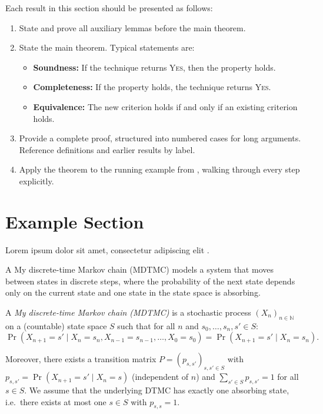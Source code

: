 Each result in this section should be presented as follows:
\begin{enumerate}
    \item State and prove all auxiliary lemmas before the main theorem.
    \item State the main theorem.  Typical statements are:
          \begin{itemize}
              \item \textbf{Soundness:} If the technique returns \textsc{Yes},
                    then the property holds.
              \item \textbf{Completeness:} If the property holds, the technique
                    returns \textsc{Yes}.
              \item \textbf{Equivalence:} The new criterion holds if and only if
                    an existing criterion holds.
          \end{itemize}
    \item Provide a complete proof, structured into numbered cases for long
          arguments.  Reference definitions and earlier results by label.
    \item Apply the theorem to the running example from ,
          walking through every step explicitly.
\end{enumerate}

\section{Example Section}

Lorem ipsum dolor sit amet, consectetur adipiscing elit \cite{Doe2024Example}. 


A My discrete-time Markov chain (MDTMC) models a system that moves between states in discrete steps, where the probability of the next state depends only on the current state and one state in the state space is absorbing.

\begin{definition}
A \emph{My discrete-time Markov chain (MDTMC)} is a stochastic process $(X_n)_{n\in\mathbb{N}}$ on a (countable) state space $S$ such that for all $n$ and $s_0,\dots,s_{n},s'\in S$:
$$
\Pr(X_{n+1}=s' \mid X_n=s_n, X_{n-1}=s_{n-1},\dots,X_0=s_0)
=\Pr(X_{n+1}=s' \mid X_n=s_n).
$$

Moreover, there exists a transition matrix $P=(p_{s,s'})_{s,s'\in S}$ with
$p_{s,s'}=\Pr(X_{n+1}=s'\mid X_n=s)$ (independent of $n$) and
$\sum_{s'\in S} p_{s,s'}=1$ for all $s\in S$.
We assume that the underlying DTMC has exactly one absorbing state, i.e.\ there exists at most one $s\in S$ with
$p_{s,s}=1$.
\end{definition}

